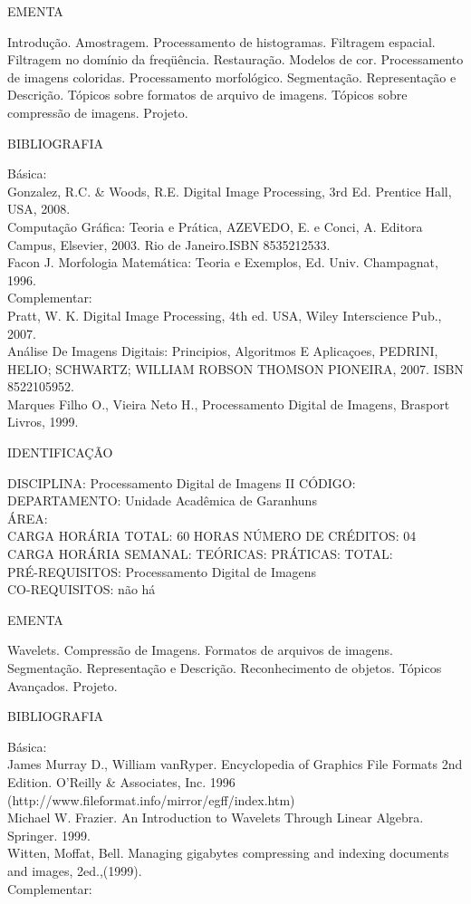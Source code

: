 \documentclass[
	12pt,				%
	openright,			%
  oneside,     %
	a4paper,			%
	chapter=TITLE,		%
	english,			%
	french,				%
	spanish,			%
	brazil				%
	]{abntex2}
\begin{document}
\begin{apendicesenv}
EMENTA 

Introdução. Amostragem. Processamento de histogramas. Filtragem
espacial. Filtragem no domínio da freqüência. Restauração. Modelos de
cor. Processamento de imagens coloridas. Processamento morfológico.
Segmentação. Representação e Descrição. Tópicos sobre formatos de
arquivo de imagens. Tópicos sobre compressão de imagens. Projeto.

BIBLIOGRAFIA 

Básica:\\
Gonzalez, R.C. \& Woods, R.E. Digital Image Processing, 3rd Ed.
Prentice Hall, USA, 2008.\\
Computação Gráfica: Teoria e Prática, AZEVEDO, E. e Conci, A. Editora
Campus, Elsevier, 2003. Rio de Janeiro.ISBN 8535212533.\\
Facon J. Morfologia Matemática: Teoria e
Exemplos, Ed. Univ. Champagnat, 1996.\\
Complementar:\\
Pratt, W. K.  Digital Image Processing, 4th ed. USA, Wiley
Interscience Pub., 2007.\\
Análise De Imagens Digitais: Principios, Algoritmos E Aplicaçoes,
PEDRINI, HELIO; SCHWARTZ; WILLIAM ROBSON THOMSON PIONEIRA, 2007. ISBN
8522105952.\\
Marques Filho O., Vieira Neto H., Processamento Digital
de Imagens, Brasport Livros, 1999.

\newpage IDENTIFICAÇÃO

DISCIPLINA: Processamento Digital de Imagens II CÓDIGO:\\ 
DEPARTAMENTO: Unidade Acadêmica de Garanhuns\\
ÁREA: \\
CARGA HORÁRIA TOTAL: 60 HORAS NÚMERO DE CRÉDITOS: 04\\
CARGA HORÁRIA SEMANAL: TEÓRICAS: PRÁTICAS: TOTAL: \\
PRÉ-REQUISITOS: Processamento Digital de Imagens\\
CO-REQUISITOS: não há

EMENTA 

Wavelets. Compressão de Imagens. Formatos de arquivos de imagens.
Segmentação. Representação e Descrição. Reconhecimento de objetos.
Tópicos Avançados. Projeto.

BIBLIOGRAFIA 

Básica:\\
James Murray D., William vanRyper. Encyclopedia of Graphics File Formats
2nd Edition. O'Reilly \& Associates, Inc. 1996
(http://www.fileformat.info/mirror/egff/index.htm)\\
Michael W. Frazier. An Introduction to Wavelets Through Linear Algebra.
Springer. 1999.\\
Witten, Moffat, Bell. Managing gigabytes compressing and indexing
documents and images, 2ed.,(1999).\\
Complementar:\\


\end{apendicesenv}
\end{document}
